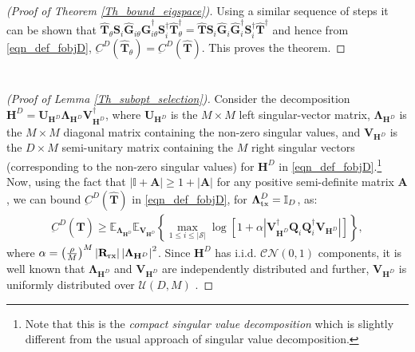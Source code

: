 \documentclass[journal,comsoc]{IEEEtran}
\begin{document}
\begin{appendices}
\begin{proof}[(Proof of Theorem \ref{Th_bound_eigspace})]
Using a similar sequence of steps it can be shown that $\hat{\mathbf{T}}_{\theta} \mathbf{S}_i \hat{\mathbf{G}}_{i\theta} \hat{\mathbf{G}}_{i\theta}^{\dag} \mathbf{S}_i^{\dag} \hat{\mathbf{T}}_{\theta}^{\dag} = \hat{\mathbf{T}} \mathbf{S}_i \hat{\mathbf{G}}_i \hat{\mathbf{G}}_i^{\dag} \mathbf{S}_i^{\dag} \hat{\mathbf{T}}^{\dag}$ and hence from \eqref{eqn_def_fobjD}, $\underbar{C}^{D}(\hat{\mathbf{T}}_{\theta}) = \underbar{C}^{D}(\hat{\mathbf{T}})$. This proves the theorem.
\end{proof}
%
\section{} \label{appdix3}
\begin{proof}[(Proof of Lemma \ref{Th_subopt_selection})]
Consider the decomposition $\mathbf{H}^D = \mathbf{U}_{\mathbf{H}^D} \boldsymbol{\Lambda}_{\mathbf{H}^D} \mathbf{V}^{\dag}_{\mathbf{H}^D}$, where $\mathbf{U}_{\mathbf{H}^D}$ is the $M\times M$ left singular-vector matrix, $ \boldsymbol{\Lambda}_{\mathbf{H}^D}$ is the $M\times M$ diagonal matrix containing the non-zero singular values, and $\mathbf{V}_{\mathbf{H}^D}$ is the $D \times M$ semi-unitary matrix containing the $M$ right singular vectors (corresponding to the non-zero singular values) for $\mathbf{H}^D$ in \eqref{eqn_def_fobjD}.\footnote{Note that this is the \emph{compact singular value decomposition} \cite{Edelman1999} which is slightly different from the usual approach of singular value decomposition.} Now, using the fact that $|\mathbb{I} + \mathbf{A}| \geq 1+ |\mathbf{A}|$ for any positive semi-definite matrix $\mathbf{A}$, we can bound $\underbar{C}^{D}(\hat{\mathbf{T}})$ in \eqref{eqn_def_fobjD}, for $\boldsymbol{\Lambda}^D_{\rm tx} = \mathbb{I}_D$, as:
\begin{eqnarray}
\underbar{C}^{D}(\hat{\mathbf{T}}) \geq \mathbb{E}_{\boldsymbol{\Lambda}_{\mathbf{H}^D}} \mathbb{E}_{\mathbf{V}_{\mathbf{H}^D}} \left\{ \max_{1 \leq i \leq |\mathcal{S}|} \log \left[ 1 + \alpha \left| \mathbf{V}^{\dag}_{\mathbf{H}^D} \mathbf{Q}_i \mathbf{Q}^{\dag}_i \mathbf{V}_{\mathbf{H}^D} \right| \right] \right\}, \label{eqn_cap_LB1} 
\end{eqnarray}
where $\alpha = {\left(\frac{\rho}{M} \right)}^M \left|\mathbf{R}_{\rm rx} \right| {\left| \boldsymbol{\Lambda}_{\mathbf{H}^D} \right|}^2$. Since $\mathbf{H}^D$ has i.i.d. $\mathcal{CN}(0,1)$ components, it is well known that $\boldsymbol{\Lambda}_{\mathbf{H}^D}$ and $\mathbf{V}_{\mathbf{H}^D}$ are independently distributed and further, $\mathbf{V}_{\mathbf{H}^D}$ is uniformly distributed over $\mathcal{U}(D,M)$ \cite[Lemma 4]{Love_SMux}. 


\end{proof}
\end{appendices}
\end{document}
